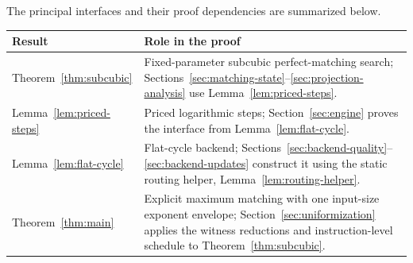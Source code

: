 The principal interfaces and their proof dependencies are summarized below.
\begin{center}
\begin{tabular}{@{}p{}p{}@{}}
\toprule
Result & Role in the proof \\
\midrule
Theorem~\ref{thm:subcubic} & Fixed-parameter subcubic perfect-matching search;
  Sections~\ref{sec:matching-state}--\ref{sec:projection-analysis} use
  Lemma~\ref{lem:priced-steps}. \\[3pt]
Lemma~\ref{lem:priced-steps} & Priced logarithmic steps;
  Section~\ref{sec:engine} proves the interface from
  Lemma~\ref{lem:flat-cycle}. \\[3pt]
Lemma~\ref{lem:flat-cycle} & Flat-cycle backend;
  Sections~\ref{sec:backend-quality}--\ref{sec:backend-updates} construct it
  using the static routing helper, Lemma~\ref{lem:routing-helper}. \\[3pt]
Theorem~\ref{thm:main} & Explicit maximum matching with one input-size exponent
  envelope; Section~\ref{sec:uniformization} applies the witness reductions
  and instruction-level schedule to Theorem~\ref{thm:subcubic}. \\
\bottomrule
\end{tabular}
\end{center}
